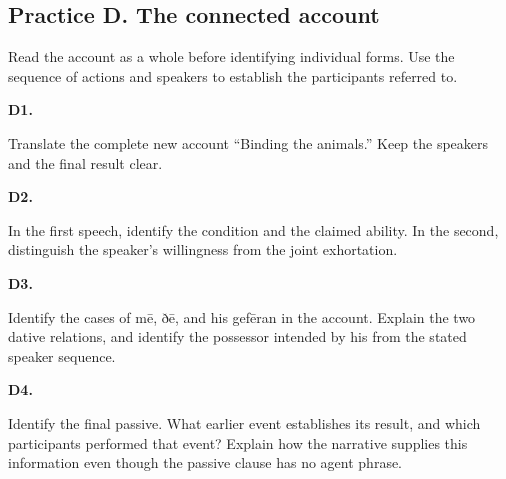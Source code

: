 \subsection*{Practice D. The connected account}

Read the account as a whole before identifying individual forms. Use the sequence of actions and speakers to establish the participants referred to.

\par\begin{minipage}{\linewidth}\raggedright
\textbf{D1.}

Translate the complete new account “Binding the animals.” Keep the speakers and the final result clear.

\end{minipage}\par\addvspace{4pt}

\par\begin{minipage}{\linewidth}\raggedright
\textbf{D2.}

In the first speech, identify the condition and the claimed ability. In the second, distinguish the speaker’s willingness from the joint exhortation.

\end{minipage}\par\addvspace{4pt}

\par\begin{minipage}{\linewidth}\raggedright
\textbf{D3.}

Identify the cases of mē, ðē, and his gefēran in the account. Explain the two dative relations, and identify the possessor intended by his from the stated speaker sequence.

\end{minipage}\par\addvspace{4pt}

\par\begin{minipage}{\linewidth}\raggedright
\textbf{D4.}

Identify the final passive. What earlier event establishes its result, and which participants performed that event? Explain how the narrative supplies this information even though the passive clause has no agent phrase.

\end{minipage}\par\addvspace{4pt}

